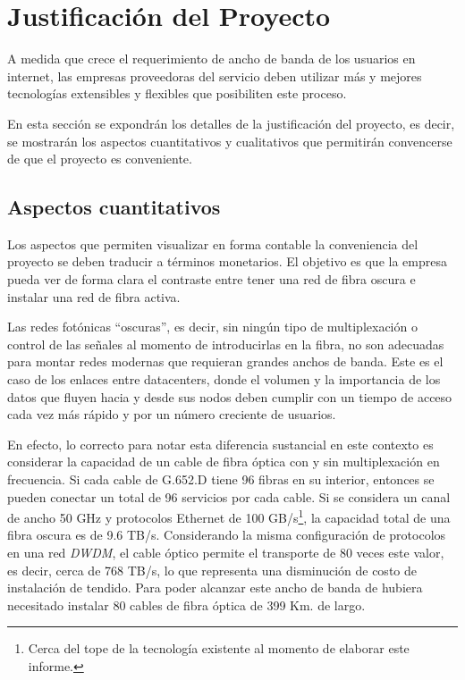\section{Justificaci\'on del Proyecto}\label{sec:justificacion}

A medida que crece el requerimiento de ancho de banda de los usuarios
en internet, las empresas proveedoras del servicio deben utilizar más
y mejores tecnologías extensibles y flexibles que posibiliten este
proceso.

En esta sección se expondrán los detalles de la justificación del
proyecto, es decir, se mostrarán los aspectos cuantitativos y
cualitativos que permitirán convencerse de que el proyecto es
conveniente.

\subsection{Aspectos cuantitativos}
\label{sec:cuantitativos}

Los aspectos que permiten visualizar en forma contable la conveniencia
del proyecto se deben traducir a términos monetarios. El objetivo es
que la empresa pueda ver de forma clara el contraste entre tener una
red de fibra oscura e instalar una red de fibra activa.

Las redes fotónicas ``oscuras'', es decir, sin ningún tipo de
multiplexación o control de las señales al momento de introducirlas en
la fibra, no son adecuadas para montar redes modernas que requieran
grandes anchos de banda. Este es el caso de los enlaces entre 
datacenters, donde el volumen y la importancia de los datos que fluyen
hacia y desde sus nodos deben cumplir con un tiempo de acceso cada vez
más rápido y por un número creciente de usuarios.

En efecto, lo correcto para notar esta diferencia sustancial en este
contexto es considerar la capacidad de un cable de fibra óptica con y
sin multiplexación en frecuencia. Si cada cable de G.652.D tiene 96
fibras en su interior, entonces se pueden conectar un total de 96
servicios por cada cable. Si se considera un canal de ancho 50 GHz y
protocolos Ethernet de 100 GB/s\footnote{Cerca del tope de la
  tecnología existente al momento de elaborar este informe.}, la
capacidad total de una fibra oscura es de 9.6 TB/s. Considerando la
misma configuración de protocolos en una red \emph{DWDM}, el cable
óptico permite el transporte de 80 veces este valor, es decir, cerca
de 768 TB/s, lo que representa una disminución de costo de instalación
de tendido. Para poder alcanzar este ancho de banda de hubiera
necesitado instalar 80 cables de fibra óptica de 399 Km. de largo.

